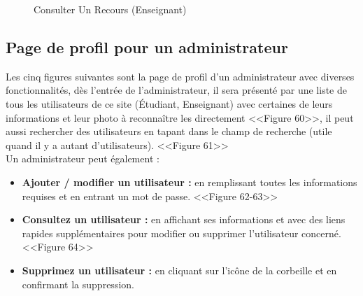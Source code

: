 \documentclass[12pt]{report}
\begin{document}
\begin{figure}[H]
\centering
  \caption{Consulter Un Recours (Enseignant)}
  \vspace*{-0.1in}
\end{figure}

\newpage

\vspace*{-0.6in}
\subsection{Page de profil pour un administrateur}

Les cinq figures suivantes sont la page de profil d'un administrateur avec diverses fonctionnalités, dès l'entrée de l'administrateur, il sera présenté par une liste de tous les utilisateurs de ce site (Étudiant, Enseignant) avec certaines de leurs informations et leur photo à reconnaître les directement <<Figure 60>>, il peut aussi rechercher des utilisateurs en tapant dans le champ de recherche (utile quand il y a autant d'utilisateurs). <<Figure 61>>
\\
Un administrateur peut également :

\begin{itemize}
  \item \textbf{Ajouter / modifier un utilisateur :} en remplissant toutes les informations requises et en entrant un mot de passe. <<Figure 62-63>>
  \item \textbf{Consultez un utilisateur :} en affichant ses informations et avec des liens rapides supplémentaires pour modifier ou supprimer l'utilisateur concerné. <<Figure 64>>
  \item \textbf{Supprimez un utilisateur :} en cliquant sur l'icône de la corbeille et en confirmant la suppression.
\end{itemize}
\end{document}
